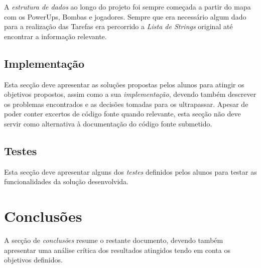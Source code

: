 \documentclass[a4paper]{article}
\begin{document}
A \emph{estrutura de dados} ao longo do projeto foi sempre começada a partir do mapa com os PowerUps, Bombas e jogadores.
Sempre que era necessário algum dado para a realização das Tarefas era percorrido a \emph{Lista de Strings} original
até encontrar a informação relevante.

\subsection{Implementação}

Esta secção deve apresentar as soluções propostas pelos alunos para
atingir os objetivos propostos, assim como a sua \emph{implementação},
devendo também descrever os problemas encontrados e as decisões
tomadas para os ultrapassar. Apesar de poder conter excertos de código
fonte quando relevante, esta secção não deve servir como alternativa à
documentação do código fonte submetido.

\subsection{Testes}

Esta secção deve apresentar alguns dos \emph{testes} definidos pelos
alunos para testar as funcionalidades da solução desenvolvida.

\section{Conclusões}
\label{sec:conclusao}

A secção de \emph{conclusões} resume o restante documento, devendo
também apresentar uma análise crítica dos resultados atingidos tendo
em conta os objetivos definidos.
\end{document}
